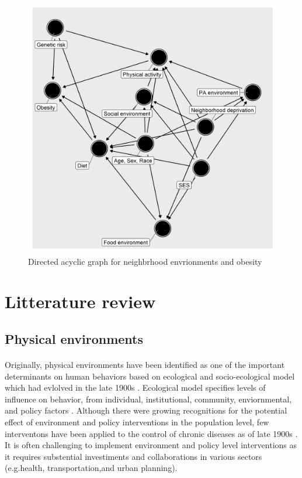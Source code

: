 \documentclass[12]{article}
\begin{document}
\begin{figure}[h!]
\centering
\includegraphics[width=\linewidth]{graph/dag1.png}
\caption{Directed acyclic graph for neighbrhood envrionments and obesity}
\label{fig:dag}
\end{figure}



\newpage

\section{Litterature review}
\subsection{Physical environments}
\paragraph{}
Originally, physical environments have been identified as one of the important determinants on human behaviors based on ecological and socio-ecological model which had evlolved in the late 1900s \cite{mcleroy1988ecological,sallis1998environmental}. Ecological model specifies levels of influence on behavior, from individual, institutional, community, enviornmental, and policy factors \cite{mcleroy1988ecological}. Although there were growing recognitions for the potential effect of environment and policy interventions in the population level, few interventons have been applied to the control of chronic diseases as of late 1900s \cite{schmid1995policy}. It is often challenging to implement environment and policy level interventions as it requires substential investiments and collaborations in various sectors (e.g.health, transportation,and urban planning).
\end{document}
